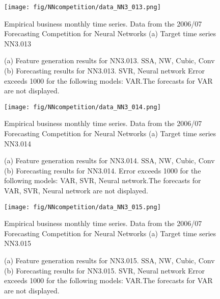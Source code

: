 \documentclass[12pt]{article}
\begin{document}
\begin{figure}
\centering
\texttt{[image: fig/NNcompetition/data\_NN3\_013.png]}
\caption{Empirical business monthly time series. Data from the 2006/07 Forecasting Competition for Neural Networks	(a) Target time series	NN3.013	}
\end{figure}


\begin{figure}
\centering
{}
\caption{(a)	Feature generation results for	NN3.013.	SSA, NW, Cubic, Conv	(b)	Forecasting results for	NN3.013.	SVR, Neural network	Error exceeds 1000 for the following models: VAR.The forecasts for VAR are not displayed.	}
\end{figure}


\begin{figure}
\centering
\texttt{[image: fig/NNcompetition/data\_NN3\_014.png]}
\caption{Empirical business monthly time series. Data from the 2006/07 Forecasting Competition for Neural Networks	(a) Target time series	NN3.014	}
\end{figure}


\begin{figure}
\centering
{}
\caption{(a)	Feature generation results for	NN3.014.	SSA, NW, Cubic, Conv	(b)	Forecasting results for	NN3.014.		Error exceeds 1000 for the following models: VAR, SVR, Neural network.The forecasts for VAR, SVR, Neural network are not displayed.	}
\end{figure}


\begin{figure}
\centering
\texttt{[image: fig/NNcompetition/data\_NN3\_015.png]}
\caption{Empirical business monthly time series. Data from the 2006/07 Forecasting Competition for Neural Networks	(a) Target time series	NN3.015	}
\end{figure}


\begin{figure}
\centering
{}
\caption{(a)	Feature generation results for	NN3.015.	SSA, NW, Cubic, Conv	(b)	Forecasting results for	NN3.015.	SVR, Neural network	Error exceeds 1000 for the following models: VAR.The forecasts for VAR are not displayed.	}
\end{figure}
\end{document}
